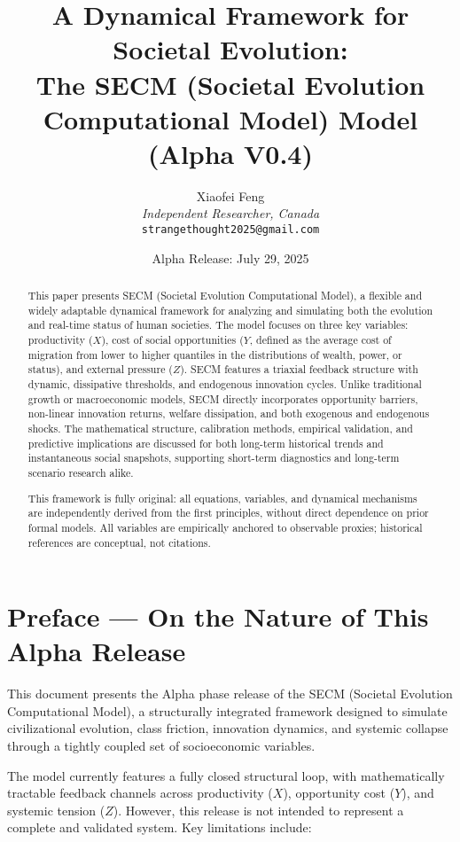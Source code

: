 \documentclass[12pt]{report}
\title{
A Dynamical Framework for Societal Evolution:\\
\textbf{The SECM (Societal Evolution Computational Model) Model (Alpha V0.4)}
}
\author{
Xiaofei Feng\\
\textit{Independent Researcher, Canada}\\
\texttt{strangethought2025@gmail.com}
}
\date{Alpha Release: July 29, 2025}
\begin{document}
\setcounter{chapter}{1}
\maketitle

\begin{abstract}
This paper presents SECM (Societal Evolution Computational Model), a flexible and widely adaptable dynamical framework for analyzing and simulating both the evolution and real-time status of human societies. The model focuses on three key variables: productivity ($X$), cost of social opportunities ($Y$, defined as the average cost of migration from lower to higher quantiles in the distributions of wealth, power, or status), and external pressure ($Z$). SECM features a triaxial feedback structure with dynamic, dissipative thresholds, and endogenous innovation cycles. Unlike traditional growth or macroeconomic models, SECM directly incorporates opportunity barriers, non-linear innovation returns, welfare dissipation, and both exogenous and endogenous shocks. The mathematical structure, calibration methods, empirical validation, and predictive implications are discussed for both long-term historical trends and instantaneous social snapshots, supporting short-term diagnostics and long-term scenario research alike.

This framework is fully original: all equations, variables, and dynamical mechanisms are independently derived from the first principles, without direct dependence on prior formal models. All variables are empirically anchored to observable proxies; historical references are conceptual, not citations.
\end{abstract}
\tableofcontents
\newpage
\section*{Preface — On the Nature of This Alpha Release}

This document presents the Alpha phase release of the SECM (Societal Evolution Computational Model), a structurally integrated framework designed to simulate civilizational evolution, class friction, innovation dynamics, and systemic collapse through a tightly coupled set of socioeconomic variables.

The model currently features a fully closed structural loop, with mathematically tractable feedback channels across productivity ($X$), opportunity cost ($Y$), and systemic tension ($Z$). However, this release is not intended to represent a complete and validated system. Key limitations include:
\end{document}
